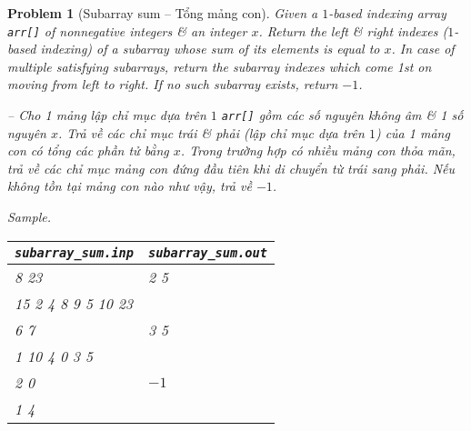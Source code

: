 \documentclass{article}
\newtheorem{problem}{Problem}
\begin{document}
\begin{problem}[Subarray sum -- Tổng mảng con]
    Given a $1$-based indexing array {\tt arr[]} of nonnegative integers \& an integer $x$. Return the left \& right indexes ($1$-based indexing) of a subarray whose sum of its elements is equal to $x$. In case of multiple satisfying subarrays, return the subarray indexes which come 1st on moving from left to right. If no such subarray exists, return $-1$.

    -- Cho 1 mảng lập chỉ mục dựa trên $1$ {\tt arr[]} gồm các số nguyên không âm \& 1 số nguyên $x$. Trả về các chỉ mục trái \& phải (lập chỉ mục dựa trên $1$) của 1 mảng con có tổng các phần tử bằng $x$. Trong trường hợp có nhiều mảng con thỏa mãn, trả về các chỉ mục mảng con đứng đầu tiên khi di chuyển từ trái sang phải. Nếu không tồn tại mảng con nào như vậy, trả về $-1$.
    \item {\sf Sample.}
    \begin{table}[H]
        \centering
        \begin{tabular}{|l|l|}
            \hline
            \verb|subarray_sum.inp| & \verb|subarray_sum.out| \\
            \hline
            8 23 & 2 5\\
            15 2 4 8 9 5 10 23 & \\
            \hline
            6 7 & 3 5\\
            1 10 4 0 3 5 & \\
            \hline
            2 0 & $-1$\\
            1 4 & \\
            \hline
        \end{tabular}
    \end{table}
\end{problem}
\end{document}
